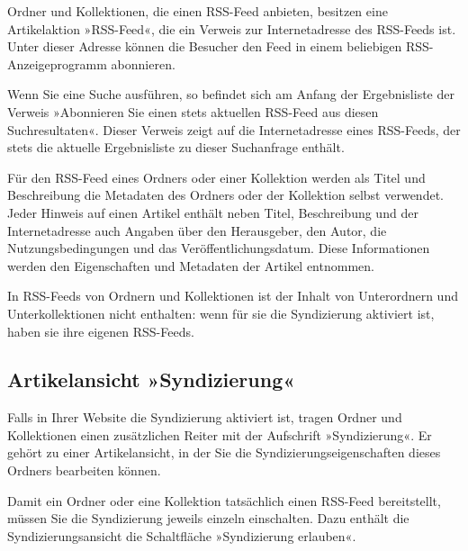 \documentclass[a4paper,12pt,ngerman]{manual}
\begin{document}
Ordner und Kollektionen, die einen RSS-Feed anbieten, besitzen eine
Artikelaktion »RSS-Feed«, die ein Verweis zur Internetadresse des RSS-Feeds
ist. Unter dieser Adresse können die Besucher den Feed in einem beliebigen
RSS-Anzeigeprogramm abonnieren.

Wenn Sie eine Suche ausführen, so befindet sich am Anfang der Ergebnisliste
der Verweis »Abonnieren Sie einen stets aktuellen RSS-Feed aus diesen
Suchresultaten«. Dieser Verweis zeigt auf die Internetadresse eines
RSS-Feeds, der stets die aktuelle Ergebnisliste zu dieser Suchanfrage
enthält.

Für den RSS-Feed eines Ordners oder einer Kollektion werden als Titel und
Beschreibung die Metadaten des Ordners oder der Kollektion selbst verwendet.
Jeder Hinweis auf einen Artikel enthält neben Titel, Beschreibung und der
Internetadresse auch Angaben über den Herausgeber, den Autor, die
Nutzungsbedingungen und das Veröffentlichungsdatum. Diese Informationen werden
den Eigenschaften und Metadaten der Artikel entnommen.

In RSS-Feeds von Ordnern und Kollektionen ist der Inhalt von Unterordnern und
Unterkollektionen nicht enthalten: wenn für sie die Syndizierung aktiviert
ist, haben sie ihre eigenen RSS-Feeds.


\subsection{Artikelansicht »Syndizierung«}

Falls in Ihrer Website die Syndizierung aktiviert ist, tragen
Ordner und Kollektionen einen zusätzlichen Reiter mit der Aufschrift
»Syndizierung«. Er gehört zu einer Artikelansicht, in der Sie die
Syndizierungseigenschaften dieses Ordners bearbeiten können.

Damit ein Ordner oder eine Kollektion tatsächlich einen RSS-Feed
bereitstellt, müssen Sie die Syndizierung jeweils einzeln einschalten. Dazu
enthält die Syndizierungsansicht die Schaltfläche »Syndizierung erlauben«.
\end{document}
